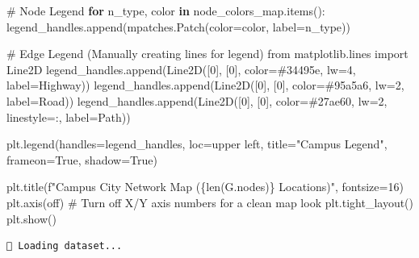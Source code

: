 \documentclass[
  letterpaper,
  DIV=11,
  numbers=noendperiod]{scrreprt}
\newenvironment{Shaded}{\begin{snugshade}}{\end{snugshade}}
\newcommand{\BuiltInTok}[1]{\textcolor[rgb]{0.00,0.23,0.31}{#1}}
\newcommand{\CommentTok}[1]{\textcolor[rgb]{0.37,0.37,0.37}{#1}}
\newcommand{\ControlFlowTok}[1]{\textcolor[rgb]{0.00,0.23,0.31}{\textbf{#1}}}
\newcommand{\DecValTok}[1]{\textcolor[rgb]{0.68,0.00,0.00}{#1}}
\newcommand{\ImportTok}[1]{\textcolor[rgb]{0.00,0.46,0.62}{#1}}
\newcommand{\KeywordTok}[1]{\textcolor[rgb]{0.00,0.23,0.31}{\textbf{#1}}}
\newcommand{\NormalTok}[1]{\textcolor[rgb]{0.00,0.23,0.31}{#1}}
\newcommand{\OperatorTok}[1]{\textcolor[rgb]{0.37,0.37,0.37}{#1}}
\newcommand{\SpecialCharTok}[1]{\textcolor[rgb]{0.37,0.37,0.37}{#1}}
\newcommand{\SpecialStringTok}[1]{\textcolor[rgb]{0.13,0.47,0.30}{#1}}
\newcommand{\StringTok}[1]{\textcolor[rgb]{0.13,0.47,0.30}{#1}}
\newcommand{\VariableTok}[1]{\textcolor[rgb]{0.07,0.07,0.07}{#1}}
\begin{document}
\begin{Shaded}
\begin{Highlighting}[]
\CommentTok{\# Node Legend}
\ControlFlowTok{for}\NormalTok{ n\_type, color }\KeywordTok{in}\NormalTok{ node\_colors\_map.items():}
\NormalTok{    legend\_handles.append(mpatches.Patch(color}\OperatorTok{=}\NormalTok{color, label}\OperatorTok{=}\NormalTok{n\_type))}

\CommentTok{\# Edge Legend (Manually creating lines for legend)}
\ImportTok{from}\NormalTok{ matplotlib.lines }\ImportTok{import}\NormalTok{ Line2D}
\NormalTok{legend\_handles.append(Line2D([}\DecValTok{0}\NormalTok{], [}\DecValTok{0}\NormalTok{], color}\OperatorTok{=}\StringTok{\textquotesingle{}\#34495e\textquotesingle{}}\NormalTok{, lw}\OperatorTok{=}\DecValTok{4}\NormalTok{, label}\OperatorTok{=}\StringTok{\textquotesingle{}Highway\textquotesingle{}}\NormalTok{))}
\NormalTok{legend\_handles.append(Line2D([}\DecValTok{0}\NormalTok{], [}\DecValTok{0}\NormalTok{], color}\OperatorTok{=}\StringTok{\textquotesingle{}\#95a5a6\textquotesingle{}}\NormalTok{, lw}\OperatorTok{=}\DecValTok{2}\NormalTok{, label}\OperatorTok{=}\StringTok{\textquotesingle{}Road\textquotesingle{}}\NormalTok{))}
\NormalTok{legend\_handles.append(Line2D([}\DecValTok{0}\NormalTok{], [}\DecValTok{0}\NormalTok{], color}\OperatorTok{=}\StringTok{\textquotesingle{}\#27ae60\textquotesingle{}}\NormalTok{, lw}\OperatorTok{=}\DecValTok{2}\NormalTok{, linestyle}\OperatorTok{=}\StringTok{\textquotesingle{}:\textquotesingle{}}\NormalTok{, label}\OperatorTok{=}\StringTok{\textquotesingle{}Path\textquotesingle{}}\NormalTok{))}

\NormalTok{plt.legend(handles}\OperatorTok{=}\NormalTok{legend\_handles, loc}\OperatorTok{=}\StringTok{\textquotesingle{}upper left\textquotesingle{}}\NormalTok{, title}\OperatorTok{=}\StringTok{"Campus Legend"}\NormalTok{, frameon}\OperatorTok{=}\VariableTok{True}\NormalTok{, shadow}\OperatorTok{=}\VariableTok{True}\NormalTok{)}

\NormalTok{plt.title(}\SpecialStringTok{f"Campus City Network Map (}\SpecialCharTok{\{}\BuiltInTok{len}\NormalTok{(G.nodes)}\SpecialCharTok{\}}\SpecialStringTok{ Locations)"}\NormalTok{, fontsize}\OperatorTok{=}\DecValTok{16}\NormalTok{)}
\NormalTok{plt.axis(}\StringTok{\textquotesingle{}off\textquotesingle{}}\NormalTok{) }\CommentTok{\# Turn off X/Y axis numbers for a clean map look}
\NormalTok{plt.tight\_layout()}
\NormalTok{plt.show()}
\end{Highlighting}
\end{Shaded}

\begin{verbatim}
📂 Loading dataset...
\end{verbatim}
\end{document}
